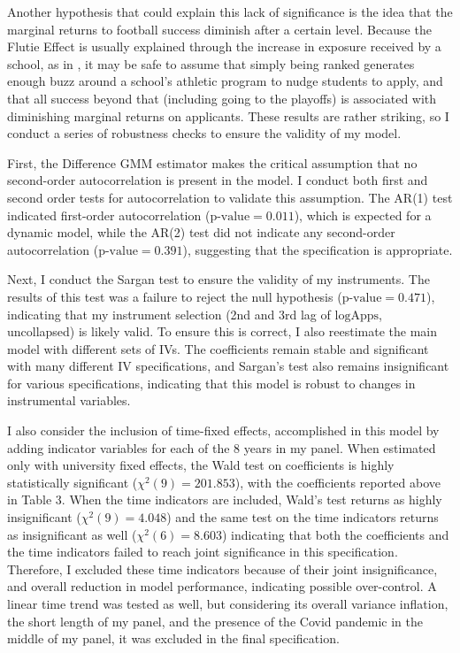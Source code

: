 \documentclass[12pt,english]{article}
\begin{document}
Another hypothesis that could explain this lack of significance is the idea that the marginal returns to football success diminish after a certain level. Because the Flutie Effect is usually explained through the increase in exposure received by a school, as in \citet{pope2014}, it may be safe to assume that simply being ranked generates enough buzz around a school’s athletic program to nudge students to apply, and that all success beyond that (including going to the playoffs) is associated with diminishing marginal returns on applicants.
These results are rather striking, so I conduct a series of robustness checks to ensure the validity of my model. 

First, the Difference GMM estimator makes the critical assumption that no second-order autocorrelation is present in the model. I conduct both first and second order tests for autocorrelation to validate this assumption. The AR(1) test indicated first-order autocorrelation ($\text{p-value}=0.011$), which is expected for a dynamic model, while the AR(2) test did not indicate any second-order autocorrelation ($\text{p-value}= 0.391$), suggesting that the specification is appropriate. 

Next, I conduct the Sargan test to ensure the validity of my instruments. The results of this test was a failure to reject the null hypothesis ($\text{p-value}= 0.471$), indicating that my instrument selection (2nd and 3rd lag of $\text{logApps}$, uncollapsed) is likely valid. To ensure this is correct, I also reestimate the main model with different sets of IVs. The coefficients remain stable and significant with many different IV specifications, and Sargan’s test also remains insignificant for various specifications, indicating that this model is robust to changes in instrumental variables.

I also consider the inclusion of time-fixed effects, accomplished in this model by adding indicator variables for each of the 8 years in my panel. When estimated only with university fixed effects, the Wald test on coefficients is highly statistically significant ($\chi^2(9) = 201.853$), with the coefficients reported above in Table 3. When the time indicators are included, Wald’s test returns as highly insignificant ($\chi^2(9) = 4.048$) and the same test on the time indicators returns as insignificant as well ($\chi^2(6) = 8.603$) indicating that both the coefficients and the time indicators failed to reach joint significance in this specification. Therefore, I excluded these time indicators because of their joint insignificance, and overall reduction in model performance, indicating possible over-control. A linear time trend was tested as well, but considering its overall variance inflation, the short length of my panel, and the presence of the Covid pandemic in the middle of my panel, it was excluded in the final specification.
\end{document}
